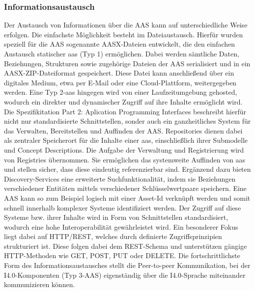 \subsubsection{Informationsaustausch}
Der Austausch von Informationen über die AAS kann auf unterschiedliche Weise erfolgen.
Die einfachste Möglichkeit besteht im Dateiaustausch. Hierfür wurden speziell für die AAS sogenannte AASX-Dateien \cite{SpezifikationPart5} entwickelt, die den einfachen Austausch statischer \acs{aas} (Typ 1) ermöglichen.
Dabei werden sämtliche Daten, Beziehungen, Strukturen sowie zugehörige Dateien der AAS serialisiert und in ein AASX-ZIP-Dateiformat gespeichert. Diese Datei kann anschließend über ein digitales Medium, etwa per E-Mail oder eine Cloud-Plattform, weitergegeben werden. 
Eine Typ 2-\acs{aas} hingegen wird von einer Laufzeitumgebung gehosted, wodurch ein direkter und dynamischer Zugriff auf ihre Inhalte ermöglicht wird. 
Die Spezifikitation Part 2: Aplication Programming Interfaces \cite{SpezifikationPart2} beschreibt hierfür nicht nur standardisierte Schnittstellen, sonder auch ein ganzheitliches System für das Verwalten, Bereitstellen und Auffinden der AAS.
Repositories dienen dabei als zentraler Speicherort für die Inhalte einer \acs{aas}, einschließlich ihrer Submodelle und Concept Descriptions.
Die Aufgabe der Verwaltung und Registrierung wird von Registries übernommen.
Sie ermöglichen das systemweite Auffinden von \acs{aas} und stellen sicher, dass diese eindeutig referenzierbar sind.
Ergänzend dazu bieten Discovery-Services eine erweiterte Suchfunktionalität, indem sie Beziehungen verschiedener Entitäten mittels verschiedener Schlüsselwertpaare speichern.
Eine AAS kann so zum Beispiel logisch mit einer Asset-Id verknüpft werden und somit schnell innerhalb komplexer Systeme identifiziert werden.
Der Zugriff auf diese Systeme bzw. ihrer Inhalte wird in Form von Schnittstellen standardisiert, wodurch eine hohe Interoperabilität gewährleistet wird.
Ein besonderer Fokus liegt dabei auf HTTP/REST, welches durch definierte Zugriffsprinzipien strukturiert ist. Diese folgen dabei dem REST-Schema und unterstützen gängige HTTP-Methoden wie GET, POST, PUT oder DELETE.
Die fortschrittlichste Form des Informationsaustausches stellt die Peer-to-peer Kommunikation, bei der I4.0-Komponenten (Typ 3-AAS) eigenständig über die I4.0-Sprache miteinander kommunizieren können.



